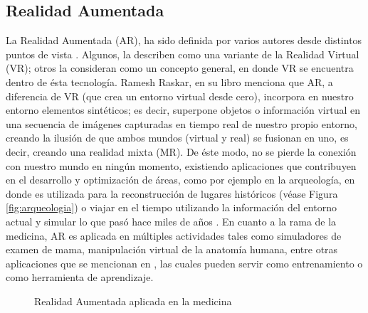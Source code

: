 \documentclass[a4paper,openright,12pt]{report}
\begin{document}
\subsection{Realidad Aumentada}
La Realidad Aumentada (AR), ha sido definida por varios autores desde distintos puntos de vista \citep{milgram1994,azuma1997}. Algunos, la describen como una variante de la Realidad Virtual (VR); otros la consideran como un concepto general, en donde VR se encuentra dentro de ésta tecnología. Ramesh Raskar, en su libro \citep{Bimber2005} menciona que AR, a diferencia de VR (que crea un entorno virtual desde cero), incorpora en nuestro entorno elementos sintéticos; es decir, superpone objetos o información virtual en una secuencia de imágenes capturadas en tiempo real de nuestro propio entorno, creando la ilusión de que ambos mundos (virtual y real) se fusionan en uno, es decir, creando una realidad mixta (MR). De éste modo, no se pierde la conexión con nuestro mundo en ningún momento, existiendo aplicaciones que contribuyen en el desarrollo y optimización de áreas, como por ejemplo en la arqueología, en donde es utilizada para la reconstrucción de lugares históricos (véase Figura \ref{fig:arqueologia}) o viajar en el tiempo utilizando la información del entorno actual y simular lo que pasó hace miles de años \citep{vlahakis2002}. En cuanto a la rama de la medicina, AR es aplicada en múltiples actividades tales como simuladores de examen de mama, manipulación virtual de la anatomía humana, entre otras aplicaciones que se mencionan en \cite{bichlmeier2007}, las cuales pueden servir como entrenamiento o como herramienta de aprendizaje.
\begin{figure}[th]
	\centering
	\caption[Realidad Aumentada aplicada a la medicina]{Realidad Aumentada aplicada en la medicina} \label{fig:medicinaAR}
\end{figure}\\
\end{document}
